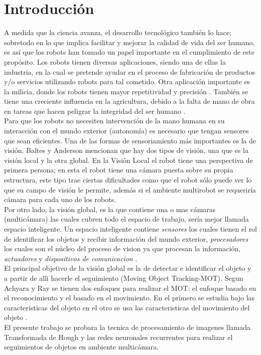 \documentclass[conference]{IEEEtran}
\begin{document}
\section{Introducci\'on}
A medida que la ciencia avanza, el desarrollo tecnol\'ogico tambi\'en lo hace; sobretodo en lo que implica facilitar y mejorar la calidad de vida del ser humano, es as\'i que los robots han tomado un papel importante en el cumplimiento de este prop\'osito. Los robots tienen diversas aplicaciones, siendo una de ellas la industria, en la cual se pretende ayudar en el proceso de fabricaci\'on de productos y/o servicios utilizando robots para tal cometido\cite{Morales_g}. Otra aplicaci\'on importante es la milicia, donde los robots tienen mayor repetitividad y precisi\'on \cite{Garcia_g}. Tambi\'en se tiene una creciente influencia en la agricultura, debido a la falta de mano de obra en tareas que hacen peligrar la integridad del ser humano \cite{Vasquez_g}.\\
Para que los robots no necesiten intervenci\'on de la  mano humana  en  su  interacci\'on    con el mundo exterior (autonom\'ia) es necesario que tengan sensores que sean eficientes. Una de las formas de sensoriamiento m\'as importantes es la de visi\'on. Baltes y Anderson mencionan que hay dos tipos de visi\'on, una que es la visi\'on local y la otra global. En la Visi\'on Local el robot tiene  una perspectiva de primera persona; en esta el robot tiene una c\'amara puesta sobre su propia estructura, este tipo trae ciertas dificultades como que el robot s\'olo puede ver lo que su campo de visi\'on le permite, adem\'as si el ambiente multirobot se requerir\'ia c\'amara para cada uno de los robots.  \cite {Baltes_g} \\
Por otro lado, la visi\'on global, es la que contiene una o mas c\'amaras (multic\'amara) las cuales cubren todo el espacio de trabajo, ser\'ia mejor llamada  espacio inteligente. Un espacio inteligente contiene \textit{sensores} los cuales tienen el rol de identificar los objetos y recibir informaci\'on del mundo exterior, \textit{procesadores} los cuales  son el n\'ucleo del proceso de vision ya que procesan la informaci\'on, \textit{actuadores}  y \textit{dispositivos de comunicacion} \cite{Brezac_g}.\\
El principal objetivo de la visi\'on global es la de detectar e identificar el objeto y  a partir de alli hacerle el seguimiento (Moving Object Tracking-MOT). Segun Achyara y Ray  se tienen dos enfoques para realizar el MOT: el enfoque basado en el reconocimiento y el basado en el movimiento. En el primero se estudia bajo las caracteristicas del objeto en el otro se usa las caracteristicas del movimiento del objeto \cite{acharya_g}.\\
El presente trabajo se probara la tecnica de procesamiento de imagenes llamada Transformada de Hough y las redes neuronales recurrentes para realizar el seguimientos de objetos en ambiente multic\'amara. \\
\end{document}

